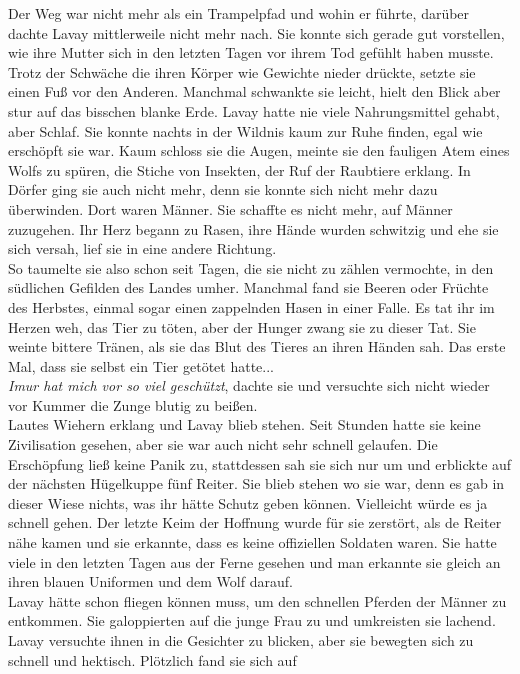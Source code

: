 Der Weg war nicht mehr als ein Trampelpfad und wohin er führte, darüber dachte Lavay mittlerweile 
nicht mehr nach. Sie konnte sich gerade gut vorstellen, wie ihre Mutter sich in den letzten Tagen 
vor ihrem Tod gefühlt haben musste. Trotz der Schwäche die ihren Körper wie Gewichte nieder 
drückte, setzte sie einen Fuß vor den Anderen. Manchmal schwankte sie leicht, hielt den Blick aber 
stur auf das bisschen blanke Erde. Lavay hatte nie viele Nahrungsmittel gehabt, aber Schlaf. Sie 
konnte nachts in der Wildnis kaum zur Ruhe finden, egal wie erschöpft sie war. Kaum schloss sie die 
Augen, meinte sie den fauligen Atem eines Wolfs zu spüren, die Stiche von Insekten, der Ruf der 
Raubtiere erklang. In Dörfer ging sie auch nicht mehr, denn sie konnte sich nicht mehr dazu 
überwinden. Dort waren Männer. Sie schaffte es nicht mehr, auf Männer zuzugehen. Ihr Herz begann zu 
Rasen, ihre Hände wurden schwitzig und ehe sie sich versah, lief sie in eine andere Richtung.\\
So taumelte sie also schon seit Tagen, die sie nicht zu zählen vermochte, in den südlichen Gefilden 
des Landes umher. Manchmal fand sie Beeren oder Früchte des Herbstes, einmal sogar einen zappelnden 
Hasen in einer Falle. Es tat ihr im Herzen weh, das Tier zu töten, aber der Hunger zwang sie zu 
dieser Tat. Sie weinte bittere Tränen, als sie das Blut des Tieres an ihren Händen sah. Das erste 
Mal, dass sie selbst ein Tier getötet hatte...\\
\textit{Imur hat mich vor so viel geschützt}, dachte sie und versuchte sich nicht wieder vor Kummer 
die Zunge blutig zu beißen.\\
Lautes Wiehern erklang und Lavay blieb stehen. Seit Stunden hatte sie keine Zivilisation gesehen, 
aber sie war auch nicht sehr schnell gelaufen. Die Erschöpfung ließ keine Panik zu, stattdessen sah 
sie sich nur um und erblickte auf der nächsten Hügelkuppe fünf Reiter. Sie blieb stehen wo sie war, 
denn es gab in dieser Wiese nichts, was ihr hätte Schutz geben können. Vielleicht würde es ja 
schnell gehen. Der letzte Keim der Hoffnung wurde für sie zerstört, als de Reiter nähe kamen und 
sie erkannte, dass es keine offiziellen Soldaten waren. Sie hatte viele in den letzten Tagen aus 
der Ferne gesehen und man erkannte sie gleich an ihren blauen Uniformen und dem Wolf darauf.\\ 
Lavay hätte schon fliegen können muss, um den schnellen Pferden der Männer zu entkommen. Sie 
galoppierten auf die junge Frau zu und umkreisten sie lachend. Lavay versuchte ihnen in die 
Gesichter zu blicken, aber sie bewegten sich zu schnell und hektisch. Plötzlich fand sie sich auf 
